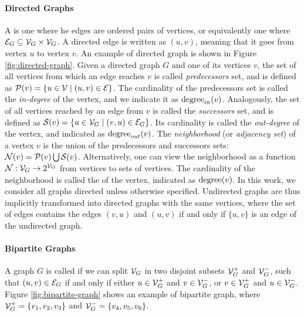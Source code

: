 \paragraph{Directed Graphs}
A  is one where he edges are ordered pairs of vertices, or equivalently one where $\Cal{E}_G \subseteq \Cal{V}_G \times \Cal{V}_G$. A directed edge is written as $(u, v)$, meaning that it goes from vertex $u$ to vertex $v$. An example of directed graph is shown in Figure \ref{fig:directed-graph}. Given a directed graph $G$ and one of its vertices $v$, the set of all vertices from which an edge reaches $v$ is called \emph{predecessors} set, and is defined as $\Cal{P}(v) = \{u \in \Cal{V} \mid (u,v) \in \Cal{E}\}$. The cardinality of the predecessors set is called the \emph{in-degree} of the vertex, and we indicate it as $\mathrm{degree}_{in}(v)$. Analogously, the set of all vertices reached by an edge from $v$ is called the \emph{successors} set, and is defined as $\Cal{s}(v) = \{u \in \Cal{V}_G \mid (v,u) \in \Cal{E}_G\}$. Its cardinality is called the \emph{out-degree} of the vertex, and indicated as $\mathrm{degree}_{out}(v)$. The \emph{neighborhood} (or \emph{adjacency set}) of a vertex $v$ is the union of the predecessors and successors sets: $\Cal{N}(v) = \Cal{P}(v) \bigcup \Cal{s}(v)$. Alternatively, one can view the neighborhood as a function $\Cal{N}: \Cal{V}_G \shortrightarrow 2^{\Cal{V}_G}$ from vertices to sets of vertices. The cardinality of the neighborhood is called the  of the vertex, indicated as $\mathrm{degree}(v)$.  In this work, we consider all graphs directed unless otherwise specified. Undirected graphs are thus implicitly transformed into directed graphs with the same vertices, where the set of edges contains the edges $(v,u)$ and $(u,v)$ if and only if $\{u,v\}$ is an edge of the undirected graph.

\paragraph{Bipartite Graphs}
A graph $G$ is called  if we can split $\Cal{V}_G$ in two disjoint subsets $\Cal{V}_G^{+}$ and $\Cal{V}_G^{-}$, such that $(u, v) \in \Cal{E}_G$ if and only if either $u \in \Cal{V}_G^{+}$ and $v \in \Cal{V}_G^{-}$, or $v \in \Cal{V}_G^{+}$ and $u \in \Cal{V}_G^{-}$. Figure \ref{fig:bipartite-graph} shows an example of bipartite graph, where
$\Cal{V}_G^{+} = \Set{v_1, v_2, v_3}$ and $\Cal{V}_G^{-} = \Set{v_4, v_5, v_6}$.


